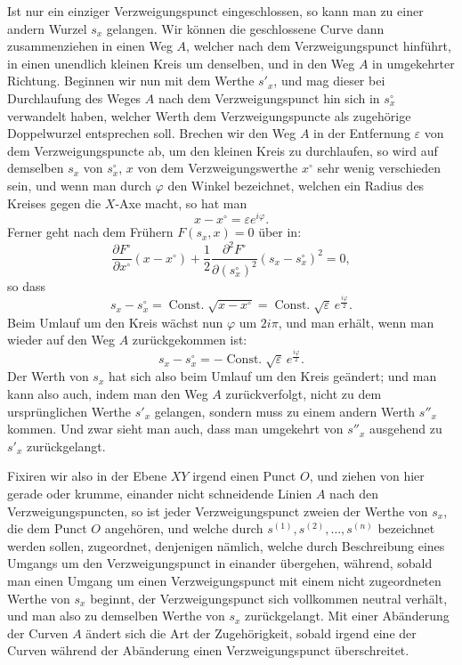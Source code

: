 \documentclass[10pt]{article}
\begin{document}
Ist nur ein einziger Verzweigungspunct eingeschlossen, so kann man zu einer andern Wurzel \(s_x\) gelangen. Wir können die geschlossene Curve dann zusammenziehen in einen Weg \(A\), welcher nach dem Verzweigungspunct hinführt, in einen unendlich kleinen Kreis um denselben, und in den Weg \(A\) in umgekehrter Richtung. Beginnen wir nun mit dem Werthe \(s'_x\), und mag dieser bei Durchlaufung des Weges \(A\) nach dem Verzweigungspunct hin sich in \(s_x^\circ\) verwandelt haben, welcher Werth dem Verzweigungspuncte als zugehörige Doppelwurzel entsprechen soll. Brechen wir den Weg \(A\) in der Entfernung \(\varepsilon\) von dem Verzweigungspuncte ab, um den kleinen Kreis zu durchlaufen, so wird auf demselben \(s_x\) von \(s_x^\circ\), \(x\) von dem Verzweigungswerthe \(x^\circ\) sehr wenig verschieden sein, und wenn man durch \(\varphi\) den Winkel bezeichnet, welchen ein Radius des Kreises gegen die \(X\)-Axe macht, so hat man
\[
x-x^\circ=\varepsilon e^{i\varphi}.
\]
Ferner geht nach dem Frühern \(F(s_x,x)=0\) über in:
\[
\frac{\partial F^\circ}{\partial x^\circ}(x-x^\circ)
+\frac{1}{2}\frac{\partial^2F^\circ}{\partial (s_x^\circ)^2}(s_x-s_x^\circ)^2=0,
\]
so dass
\[
s_x-s_x^\circ=\operatorname{Const.}\sqrt{x-x^\circ}
=\operatorname{Const.}\sqrt\varepsilon\, e^{\frac{i\varphi}{2}}.
\]
Beim Umlauf um den Kreis wächst nun \(\varphi\) um \(2i\pi\), und man erhält, wenn man wieder auf den Weg \(A\) zurückgekommen ist:
\[
s_x-s_x^\circ=-\operatorname{Const.}\sqrt\varepsilon\, e^{\frac{i\varphi}{2}}.
\]
Der Werth von \(s_x\) hat sich also beim Umlauf um den Kreis geändert; und man kann also auch, indem man den Weg \(A\) zurückverfolgt, nicht zu dem ursprünglichen Werthe \(s'_x\) gelangen, sondern muss zu einem andern Werth \(s''_x\) kommen. Und zwar sieht man auch, dass man umgekehrt von \(s''_x\) ausgehend zu \(s'_x\) zurückgelangt.

Fixiren wir also in der Ebene \(XY\) irgend einen Punct \(O\), und ziehen von hier gerade oder krumme, einander nicht schneidende Linien \(A\) nach den Verzweigungspuncten, so ist jeder Verzweigungspunct zweien der Werthe von \(s_x\), die dem Punct \(O\) angehören, und welche durch \(s^{(1)},s^{(2)},\ldots,s^{(n)}\) bezeichnet werden sollen, zugeordnet, denjenigen nämlich, welche durch Beschreibung eines Umgangs um den Verzweigungspunct in einander übergehen, während, sobald man einen Umgang um einen Verzweigungspunct mit einem nicht zugeordneten Werthe von \(s_x\) beginnt, der Verzweigungspunct sich vollkommen neutral verhält, und man also zu demselben Werthe von \(s_x\) zurückgelangt. Mit einer Abänderung der Curven \(A\) ändert sich die Art der Zugehörigkeit, sobald irgend eine der Curven während der Abänderung einen Verzweigungspunct überschreitet.
\end{document}
